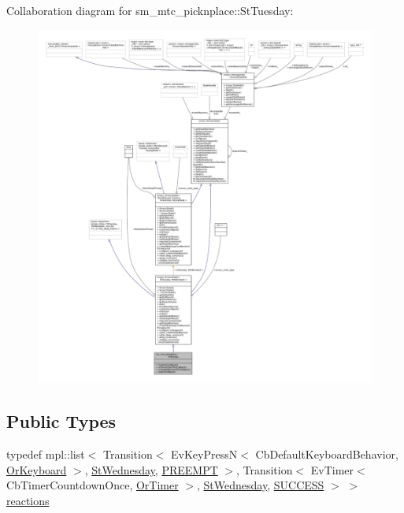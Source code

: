 Collaboration diagram for sm\+\_\+mtc\+\_\+picknplace\+:\+:St\+Tuesday\+:
\nopagebreak
\begin{figure}[H]
\begin{center}
\leavevmode
\includegraphics[width=350pt]{structsm__mtc__picknplace_1_1StTuesday__coll__graph}
\end{center}
\end{figure}
\subsection*{Public Types}
\begin{DoxyCompactItemize}
\item 
typedef mpl\+::list$<$ Transition$<$ Ev\+Key\+PressN$<$ Cb\+Default\+Keyboard\+Behavior, \hyperlink{classsm__mtc__picknplace_1_1OrKeyboard}{Or\+Keyboard} $>$, \hyperlink{structsm__mtc__picknplace_1_1StWednesday}{St\+Wednesday}, \hyperlink{classPREEMPT}{P\+R\+E\+E\+M\+PT} $>$, Transition$<$ Ev\+Timer$<$ Cb\+Timer\+Countdown\+Once, \hyperlink{classsm__mtc__picknplace_1_1OrTimer}{Or\+Timer} $>$, \hyperlink{structsm__mtc__picknplace_1_1StWednesday}{St\+Wednesday}, \hyperlink{classSUCCESS}{S\+U\+C\+C\+E\+SS} $>$ $>$ \hyperlink{structsm__mtc__picknplace_1_1StTuesday_afd77700918b8d9453b4def53eedee1df}{reactions}
\end{DoxyCompactItemize}
